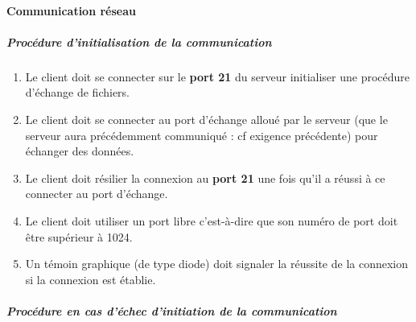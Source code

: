 \documentclass[10pt,a4paper]{report}
\begin{document}
\paragraph{Communication réseau}

	\subparagraph{Procédure d'initialisation de la communication}

		\begin{enumerate}

			\item Le client doit se connecter sur le \textbf{port 21} du serveur initialiser une procédure d'échange de fichiers.
			\item Le client doit se connecter au port d'échange alloué par le serveur (que le serveur aura précédemment communiqué : cf exigence précédente) pour échanger des données.
			\item Le client doit résilier la connexion au \textbf{port 21} une fois qu'il a réussi à ce connecter au port d'échange.
			\item Le client doit utiliser un port libre c'est-à-dire que son numéro de port doit être supérieur à 1024.
			\item Un témoin graphique (de type diode) doit signaler la réussite de la connexion si la connexion est établie. 
			\end{enumerate}

	\subparagraph{Procédure en cas d'échec d'initiation de la communication }
\end{document}
